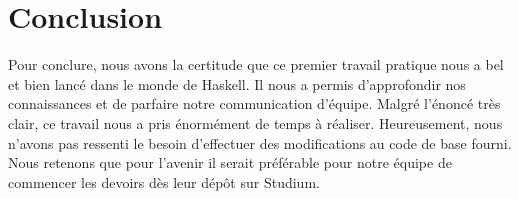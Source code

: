 \documentclass[a4paper,12pt]{article}
\begin{document}
\section*{Conclusion}
Pour conclure, nous avons la certitude que ce premier travail pratique nous a bel et bien lancé dans le monde de Haskell. Il nous a permis d’approfondir nos connaissances et de parfaire notre communication d’équipe. Malgré l’énoncé très clair, ce travail nous a pris énormément de temps à réaliser. Heureusement, nous n’avons pas ressenti le besoin d’effectuer des modifications au code de base fourni. Nous retenons que pour l’avenir il serait préférable pour notre équipe de commencer les devoirs dès leur dépôt sur Studium.
\end{document}
